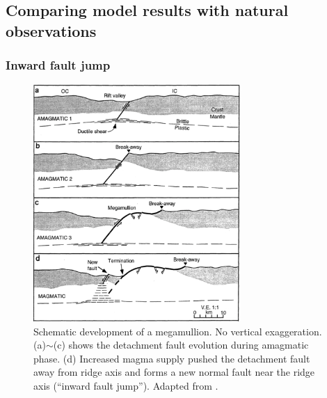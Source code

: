 \subsection{Comparing model results with natural observations}


\subsubsection{Inward fault jump}
\begin{figure}[h]
 \centering
  \includegraphics[width=0.7\textwidth]{./Figures/fig_Discussion_Observation_1_Tucholke1998.eps}
 \caption[Schematic development of a megamullion from amagmatic to magmatic, adapted from \citep{Tucholke1998}.]{Schematic development of a megamullion. No vertical exaggeration. (a)$\sim$(c) shows the detachment fault evolution during amagmatic phase. (d) Increased magma supply pushed the detachment fault away from ridge axis and forms a new normal fault near the ridge axis (``inward fault jump''). Adapted from \citep{Tucholke1998}.}
 \label{fig_Discussion_Observation_1_Tucholke1998}
\end{figure}

